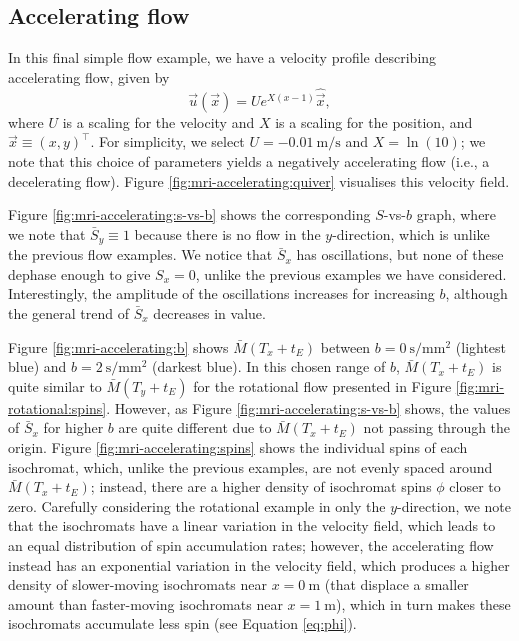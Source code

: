         \subsection{Accelerating flow} \label{sec:numerical-mri:manufactured:accelerating}
            In this final simple flow example, we have a velocity profile describing accelerating flow, given by
            \begin{equation}
                \vec{u}(\vec{x}) = U e^{X(x-1)} \hat{\vec{x}},
                \label{eq:mri-accelerating}
            \end{equation}
            where $U$ is a scaling for the velocity and $X$ is a scaling for the position, and $\vec{x} \equiv (x, y)^\intercal$. For simplicity, we select $U = \qty{-0.01}{\metre\per\second}$ and $X = \ln(10)$; we note that this choice of parameters yields a negatively accelerating flow (i.e., a decelerating flow). Figure \ref{fig:mri-accelerating:quiver} visualises this velocity field.
            
            Figure \ref{fig:mri-accelerating:s-vs-b} shows the corresponding $S$-vs-$b$ graph, where we note that $\bar{S}_y \equiv 1$ because there is no flow in the $y$-direction, which is unlike the previous flow examples. We notice that $\bar{S}_x$ has oscillations, but none of these dephase enough to give $S_x=0$, unlike the previous examples we have considered. Interestingly, the amplitude of the oscillations increases for increasing $b$, although the general trend of $\bar{S}_x$ decreases in value.
            
            Figure \ref{fig:mri-accelerating:b} shows $\bar{M}(T_x + t_E)$ between $b=\qty{0}{\second\per\milli\metre^2}$ (lightest blue) and $b=\qty{2}{\second\per\milli\metre^2}$ (darkest blue). In this chosen range of $b$, $\bar{M}(T_x + t_E)$ is quite similar to $\bar{M}(T_y + t_E)$ for the rotational flow presented in Figure \ref{fig:mri-rotational:spins}. However, as Figure \ref{fig:mri-accelerating:s-vs-b} shows, the values of $\bar{S}_x$ for higher $b$ are quite different due to $\bar{M}(T_x + t_E)$ not passing through the origin. Figure \ref{fig:mri-accelerating:spins} shows the individual spins of each isochromat, which, unlike the previous examples, are not evenly spaced around $\bar{M}(T_x + t_E)$; instead, there are a higher density of isochromat spins $\phi$ closer to zero. Carefully considering the rotational example in only the $y$-direction, we note that the isochromats have a linear variation in the velocity field, which leads to an equal distribution of spin accumulation rates; however, the accelerating flow instead has an exponential variation in the velocity field, which produces a higher density of slower-moving isochromats near $x=\qty{0}{\metre}$ (that displace a smaller amount than faster-moving isochromats near $x=\qty{1}{\metre}$), which in turn makes these isochromats accumulate less spin (see Equation \eqref{eq:phi}).

